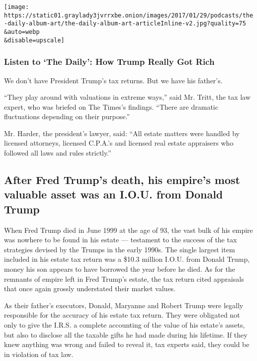 \texttt{[image: https://static01.graylady3jvrrxbe.onion/images/2017/01/29/podcasts/the-daily-album-art/the-daily-album-art-articleInline-v2.jpg?quality=75\\\&auto=webp\\\&disable=upscale]}

\hypertarget{listen-to-the-daily-how-trump-really-got-rich}{%
\subsubsection{Listen to `The Daily': How Trump Really Got
Rich}\label{listen-to-the-daily-how-trump-really-got-rich}}

We don't have President Trump's tax returns. But we have his father's.

``They play around with valuations in extreme ways,'' said Mr. Tritt,
the tax law expert, who was briefed on The Times's findings. ``There are
dramatic fluctuations depending on their purpose.''

Mr. Harder, the president's lawyer, said: ``All estate matters were
handled by licensed attorneys, licensed C.P.A.'s and licensed real
estate appraisers who followed all laws and rules strictly.''

\hypertarget{after-fred-trumps-death-his-empires-most-valuable-asset-was-an-iou-from-donald-trump}{%
\subsection{After Fred Trump's death, his empire's most valuable asset
was an I.O.U. from Donald
Trump}\label{after-fred-trumps-death-his-empires-most-valuable-asset-was-an-iou-from-donald-trump}}

When Fred Trump died in June 1999 at the age of 93, the vast bulk of his
empire was nowhere to be found in his estate --- testament to the
success of the tax strategies devised by the Trumps in the early 1990s.
The single largest item included in his estate tax return was a \$10.3
million I.O.U. from Donald Trump, money his son appears to have borrowed
the year before he died. As for the remnants of empire left in Fred
Trump's estate, the tax return cited appraisals that once again grossly
understated their market values.

As their father's executors, Donald, Maryanne and Robert Trump were
legally responsible for the accuracy of his estate tax return. They were
obligated not only to give the I.R.S. a complete accounting of the value
of his estate's assets, but also to disclose all the taxable gifts he
had made during his lifetime. If they knew anything was wrong and failed
to reveal it, tax experts said, they could be in violation of tax law.

